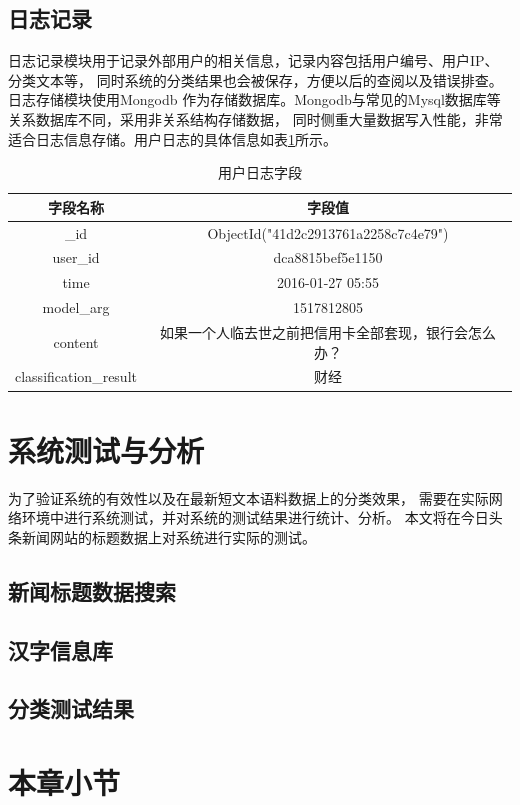 \subsection{日志记录}
日志记录模块用于记录外部用户的相关信息，记录内容包括用户编号、用户IP、分类文本等，
同时系统的分类结果也会被保存，方便以后的查阅以及错误排查。日志存储模块使用Mongodb
作为存储数据库。Mongodb与常见的Mysql数据库等关系数据库不同，采用非关系结构存储数据，
同时侧重大量数据写入性能，非常适合日志信息存储。用户日志的具体信息如表\ref{log_table}所示。
\begin{table}[h]
    \caption{用户日志字段}
    \begin{tabular}{|c|c|}
        \hline
        字段名称 & 字段值 \\
        \hline
        \_id & ObjectId("41d2c2913761a2258c7c4e79") \\
        \hline
        user\_id & dca8815bef5e1150 \\
        \hline
        time & 2016-01-27 05:55 \\
        \hline
        model\_arg & 1517812805 \\
        \hline
        content & 如果一个人临去世之前把信用卡全部套现，银行会怎么办？ \\
        \hline
        classification\_result & 财经 \\
        \hline
    \end{tabular}
    \label{log_table}
    \end{table}

\section{系统测试与分析}
为了验证系统的有效性以及在最新短文本语料数据上的分类效果，
需要在实际网络环境中进行系统测试，并对系统的测试结果进行统计、分析。
本文将在今日头条新闻网站的标题数据上对系统进行实际的测试。
\subsection{新闻标题数据搜索}
\subsection{汉字信息库}
\subsection{分类测试结果}
\section{本章小节}